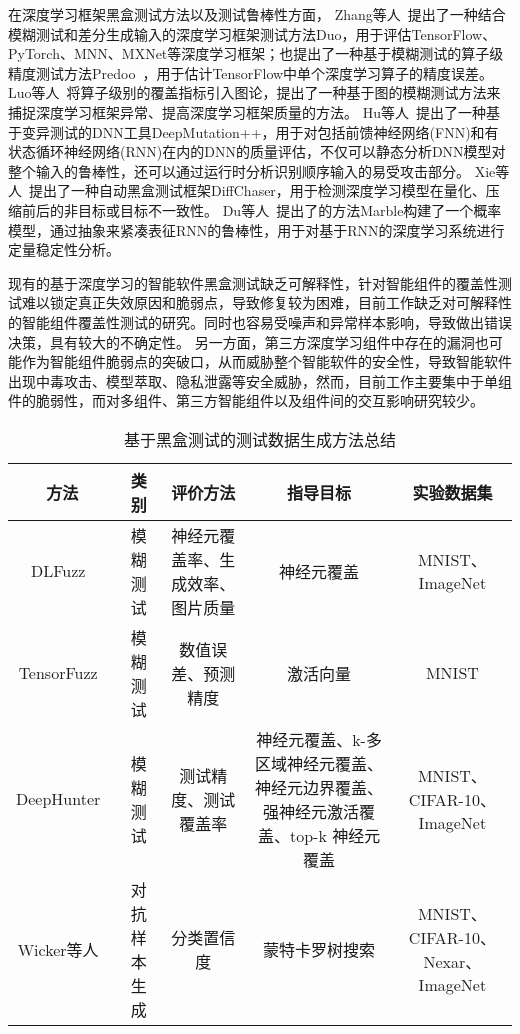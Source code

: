 在深度学习框架黑盒测试方法以及测试鲁棒性方面，
Zhang等人~提出了一种结合模糊测试和差分生成输入的深度学习框架测试方法Duo，用于评估TensorFlow、PyTorch、MNN、MXNet等深度学习框架；也提出了一种基于模糊测试的算子级精度测试方法Predoo~，用于估计TensorFlow中单个深度学习算子的精度误差。
Luo等人~将算子级别的覆盖指标引入图论，提出了一种基于图的模糊测试方法来捕捉深度学习框架异常、提高深度学习框架质量的方法。
Hu等人~提出了一种基于变异测试的DNN工具DeepMutation++，用于对包括前馈神经网络(FNN)和有状态循环神经网络(RNN)在内的DNN的质量评估，不仅可以静态分析DNN模型对整个输入的鲁棒性，还可以通过运行时分析识别顺序输入的易受攻击部分。
Xie等人~提出了一种自动黑盒测试框架DiffChaser，用于检测深度学习模型在量化、压缩前后的非目标或目标不一致性。
Du等人~提出了的方法Marble构建了一个概率模型，通过抽象来紧凑表征RNN的鲁棒性，用于对基于RNN的深度学习系统进行定量稳定性分析。


现有的基于深度学习的智能软件黑盒测试缺乏可解释性，针对智能组件的覆盖性测试难以锁定真正失效原因和脆弱点，导致修复较为困难，目前工作缺乏对可解释性的智能组件覆盖性测试的研究。同时也容易受噪声和异常样本影响，导致做出错误决策，具有较大的不确定性。
另一方面，第三方深度学习组件中存在的漏洞也可能作为智能组件脆弱点的突破口，从而威胁整个智能软件的安全性，导致智能软件出现中毒攻击、模型萃取、隐私泄露等安全威胁，然而，目前工作主要集中于单组件的脆弱性，而对多组件、第三方智能组件以及组件间的交互影响研究较少。



\begin{table}[t]
	\small
	\centering
	\caption{基于黑盒测试的测试数据生成方法总结}
	\label{tab:testingData_blackBox}
	\begin{tabular}{c|c|c|c|c}
		\toprule
		方法 & 类别 & 评价方法 & 指导目标 & 实验数据集 \\
		\midrule
		DLFuzz~\citess{Guo2018DLFuzz} & 模糊测试 & 神经元覆盖率、生成效率、图片质量 & 神经元覆盖 & MNIST、ImageNet \\
		\midrule
	    TensorFuzz~\citess{Odena2019TensorFuzz} & 模糊测试 & 数值误差、预测精度 & 激活向量 & MNIST \\
	    \midrule
	    DeepHunter~\citess{xie2019coverage} & 模糊测试 & 测试精度、测试覆盖率 & 神经元覆盖、k-多区域神经元覆盖、神经元边界覆盖、强神经元激活覆盖、top-k 神经元覆盖 & MNIST、CIFAR-10、ImageNet \\
	    \midrule
	    Wicker等人~\citess{Wicker2018FeatureGuided} & 对抗样本生成 & 分类置信度 & 蒙特卡罗树搜索 & MNIST、CIFAR-10、Nexar、ImageNet \\
	    
	    
		\bottomrule
	\end{tabular}
\end{table}















